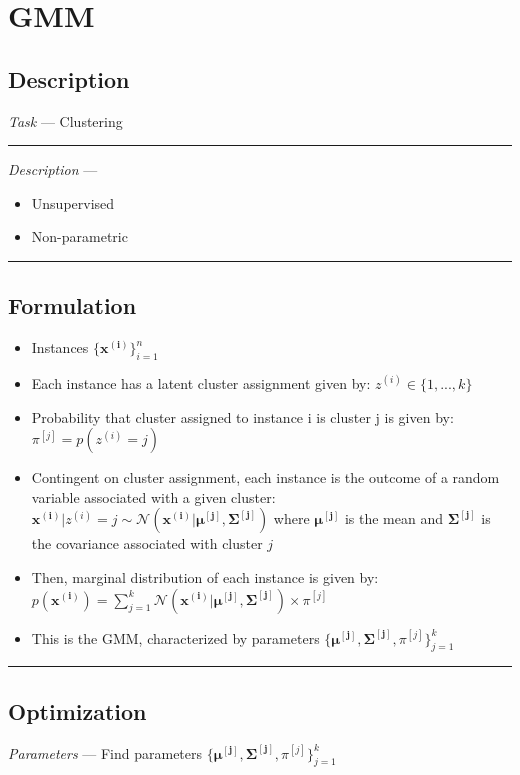\section{GMM}
\subsection*{Description}
\emph{Task} --- Clustering

{\color{lightgray}\hrule height 0.001mm}

\emph{Description} --- 
\begin{itemize}
    \item Unsupervised
    \item Non-parametric
\end{itemize}

{\color{black}\hrule height 0.001mm}

\subsection*{Formulation}

\begin{itemize}
    \item Instances $\{\boldsymbol{x^{(i)}}\}_{i=1}^n$
    \item Each instance has a latent cluster assignment given by: $z^{(i)} \in \{1,...,k\}$
    \item Probability that cluster assigned to instance i is cluster j is given by: $\pi^{[j]} = p(z^{(i)} = j)$ 
    \item Contingent on cluster assignment, each instance is the outcome of a random variable associated with a given cluster: $\boldsymbol{x^{(i)}} | z^{(i)} = j \sim \mathcal{N}(\boldsymbol{x^{(i)}} | \boldsymbol{\mu^{[j]}}, \boldsymbol{\Sigma^{[j]}})$ where $\boldsymbol{\mu^{[j]}}$ is the mean and $\boldsymbol{\Sigma^{[j]}}$ is the covariance associated with cluster $j$
    \item Then, marginal distribution of each instance is given by: $p(\boldsymbol{x^{(i)}}) = \sum_{j=1}^k \mathcal{N}(\boldsymbol{x^{(i)}} | \boldsymbol{\mu^{[j]}}, \boldsymbol{\Sigma^{[j]}}) \times \pi^{[j]}$
    \item This is the GMM, characterized by parameters $\{ \boldsymbol{\mu^{[j]}}, \boldsymbol{\Sigma^{[j]}}, \pi^{[j]} \}_{j=1}^k$
\end{itemize}

{\color{black}\hrule height 0.001mm}

\subsection*{Optimization}
\emph{Parameters} --- Find parameters $\{\boldsymbol{\mu^{[j]}}, \boldsymbol{\Sigma^{[j]}}, \pi^{[j]}\}_{j=1}^k$

